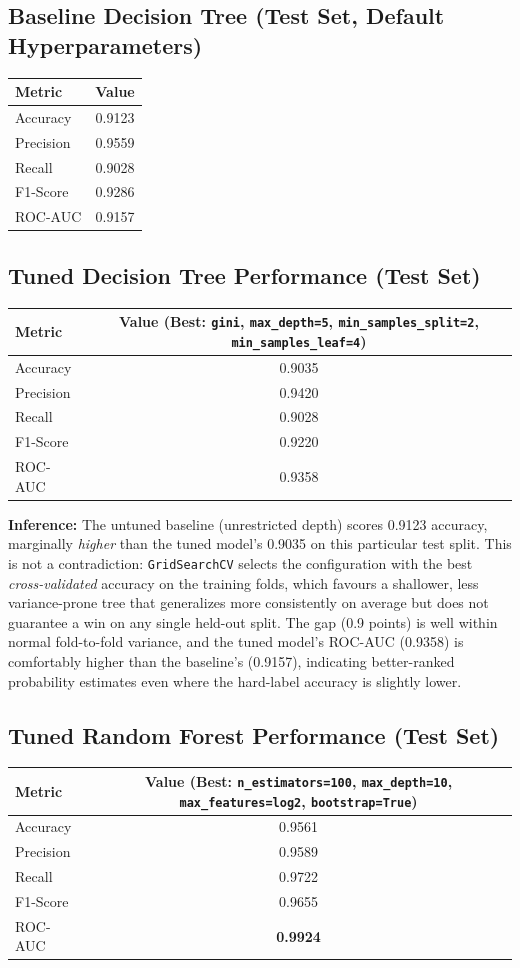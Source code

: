 \documentclass[12pt,a4paper]{article}
\begin{document}
\subsection*{Baseline Decision Tree (Test Set, Default Hyperparameters)}
\begin{tabular}{lc}
\toprule
Metric & Value \\
\midrule
Accuracy & 0.9123 \\
Precision & 0.9559 \\
Recall & 0.9028 \\
F1-Score & 0.9286 \\
ROC-AUC & 0.9157 \\
\bottomrule
\end{tabular}

\subsection*{Tuned Decision Tree Performance (Test Set)}
\begin{tabular}{lc}
\toprule
Metric & Value (Best: \texttt{gini}, \texttt{max\_depth=5},
\texttt{min\_samples\_split=2}, \texttt{min\_samples\_leaf=4}) \\
\midrule
Accuracy & 0.9035 \\
Precision & 0.9420 \\
Recall & 0.9028 \\
F1-Score & 0.9220 \\
ROC-AUC & 0.9358 \\
\bottomrule
\end{tabular}
\vspace{2mm}

\textbf{Inference:} The untuned baseline (unrestricted depth) scores 0.9123 accuracy,
marginally \emph{higher} than the tuned model's 0.9035 on this particular test split.
This is not a contradiction: \texttt{GridSearchCV} selects the configuration with the
best \emph{cross-validated} accuracy on the training folds, which favours a shallower,
less variance-prone tree that generalizes more consistently on average but does not
guarantee a win on any single held-out split. The gap (0.9 points) is well within
normal fold-to-fold variance, and the tuned model's ROC-AUC (0.9358) is comfortably
higher than the baseline's (0.9157), indicating better-ranked probability estimates
even where the hard-label accuracy is slightly lower.

\subsection*{Tuned Random Forest Performance (Test Set)}
\begin{tabular}{lc}
\toprule
Metric & Value (Best: \texttt{n\_estimators=100}, \texttt{max\_depth=10},
\texttt{max\_features=log2}, \texttt{bootstrap=True}) \\
\midrule
Accuracy & 0.9561 \\
Precision & 0.9589 \\
Recall & 0.9722 \\
F1-Score & 0.9655 \\
ROC-AUC & \textbf{0.9924} \\
\bottomrule
\end{tabular}
\end{document}
